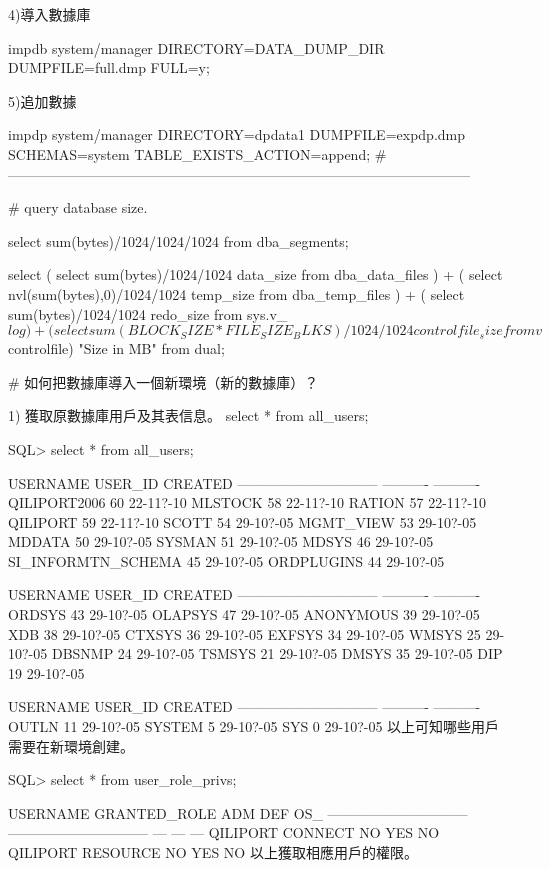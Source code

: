 \begin{table}
4)導入數據庫

impdb system/manager DIRECTORY=DATA_DUMP_DIR DUMPFILE=full.dmp FULL=y;

5)追加數據

impdp system/manager DIRECTORY=dpdata1 DUMPFILE=expdp.dmp SCHEMAS=system TABLE_EXISTS_ACTION=append;
#---------------------------------------------------------------------------------------------------


# query database size.

select sum(bytes)/1024/1024/1024 from dba_segments;

select
( select sum(bytes)/1024/1024 data_size from dba_data_files ) +
( select nvl(sum(bytes),0)/1024/1024 temp_size from dba_temp_files ) +
( select sum(bytes)/1024/1024 redo_size from sys.v_$log ) +
( select sum(BLOCK_SIZE*FILE_SIZE_BLKS)/1024/1024 controlfile_size from v$controlfile) "Size in MB"
from
dual;

# 如何把數據庫導入一個新環境（新的數據庫）？

1) 獲取原數據庫用戶及其表信息。
select * from all_users;

SQL> select * from all_users;

USERNAME			  USER_ID CREATED
------------------------------ ---------- ----------
QILIPORT2006			       60 22-11?-10
MLSTOCK 			       58 22-11?-10
RATION				       57 22-11?-10
QILIPORT			       59 22-11?-10
SCOTT				       54 29-10?-05
MGMT_VIEW			       53 29-10?-05
MDDATA				       50 29-10?-05
SYSMAN				       51 29-10?-05
MDSYS				       46 29-10?-05
SI_INFORMTN_SCHEMA		       45 29-10?-05
ORDPLUGINS			       44 29-10?-05

USERNAME			  USER_ID CREATED
------------------------------ ---------- ----------
ORDSYS				       43 29-10?-05
OLAPSYS 			       47 29-10?-05
ANONYMOUS			       39 29-10?-05
XDB				       38 29-10?-05
CTXSYS				       36 29-10?-05
EXFSYS				       34 29-10?-05
WMSYS				       25 29-10?-05
DBSNMP				       24 29-10?-05
TSMSYS				       21 29-10?-05
DMSYS				       35 29-10?-05
DIP				       19 29-10?-05

USERNAME			  USER_ID CREATED
------------------------------ ---------- ----------
OUTLN				       11 29-10?-05
SYSTEM					5 29-10?-05
SYS					0 29-10?-05
以上可知哪些用戶需要在新環境創建。

SQL> select * from user_role_privs;  

USERNAME               GRANTED_ROLE           ADM DEF OS_
------------------------------ ------------------------------ --- --- ---
QILIPORT               CONNECT                NO  YES NO
QILIPORT               RESOURCE               NO  YES NO
以上獲取相應用戶的權限。


\end{table}
